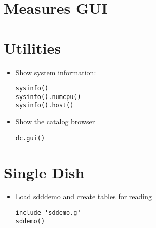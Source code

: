 \section{Measures GUI}

\section{Utilities}

\begin{itemize}
\item Show system information:
\begin{verbatim}
sysinfo()
sysinfo().numcpu()
sysinfo().host()
\end{verbatim}
\item Show the catalog browser
\begin{verbatim}
dc.gui()
\end{verbatim}
\end{itemize}

\section{Single Dish}

\begin{itemize}
\item Load sdddemo and create tables for reading
\begin{verbatim}
include 'sddemo.g'
sddemo()
\end{verbatim}
\end{itemize}
